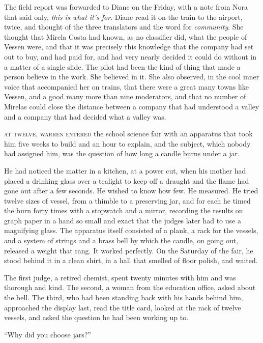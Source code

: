 The field report was forwarded to Diane on the Friday, with a note from Nora that said only, \emph{this is what it's for}. Diane read it on the train to the airport, twice, and thought of the three translators and the word for \emph{community}. She thought that Mirela Costa had known, as no classifier did, what the people of Vessen were, and that it was precisely this knowledge that the company had set out to buy, and had paid for, and had very nearly decided it could do without in a matter of a single slide. The pilot had been the kind of thing that made a person believe in the work. She believed in it. She also observed, in the cool inner voice that accompanied her on trains, that there were a great many towns like Vessen, and a good many more than nine moderators, and that no number of Mirelas could close the distance between a company that had understood a valley and a company that had decided what a valley was.


\textsc{at twelve, warren entered} the school science fair with an apparatus that took him five weeks to build and an hour to explain, and the subject, which nobody had assigned him, was the question of how long a candle burns under a jar.

He had noticed the matter in a kitchen, at a power cut, when his mother had placed a drinking glass over a tealight to keep off a draught and the flame had gone out after a few seconds. He wished to know how few. He measured. He tried twelve sizes of vessel, from a thimble to a preserving jar, and for each he timed the burn forty times with a stopwatch and a mirror, recording the results on graph paper in a hand so small and exact that the judges later had to use a magnifying glass. The apparatus itself consisted of a plank, a rack for the vessels, and a system of strings and a brass bell by which the candle, on going out, released a weight that rang. It worked perfectly. On the Saturday of the fair, he stood behind it in a clean shirt, in a hall that smelled of floor polish, and waited.

The first judge, a retired chemist, spent twenty minutes with him and was thorough and kind. The second, a woman from the education office, asked about the bell. The third, who had been standing back with his hands behind him, approached the display last, read the title card, looked at the rack of twelve vessels, and asked the question he had been working up to.

``Why did you choose jars?''

